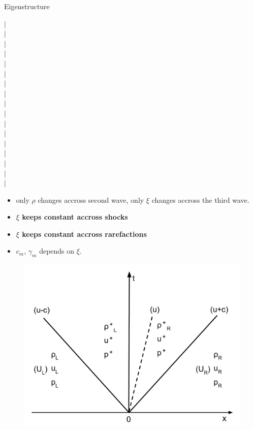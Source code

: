 \documentclass{beamer}
\begin{document}
\begin{frame}{Eigenstructure}
\begin{minipage}{.54\textwidth}
\end{minipage}
\begin{minipage}{.01\textwidth}
$\vert$\\
$\vert$\\
$\vert$\\
$\vert$\\
$\vert$\\
$\vert$\\
$\vert$\\
$\vert$\\
$\vert$\\
$\vert$\\
$\vert$\\
$\vert$\\
$\vert$\\
$\vert$\\
$\vert$\\
$\vert$\\
$\vert$\\
\end{minipage}
\begin{minipage}{.43\textwidth}
\begin{itemize}
\item only $\rho$ changes accross second wave, only $\xi$ changes accross the third wave.
\item \textbf{$\xi$ keeps constant accross shocks}
\item \textbf{$\xi$ keeps constant accross rarefactions}
\item $c_m$, $\gamma_m$ depends on $\xi$.
\end{itemize} 
\begin{figure}
\centering
\includegraphics[width=.80\textwidth]{./Chapter-2/Figures/Solution_Structure_RP_simplified}
\label{fig:Domain_3D}
\end{figure}
\end{minipage}
%
\end{frame}
\end{document}
